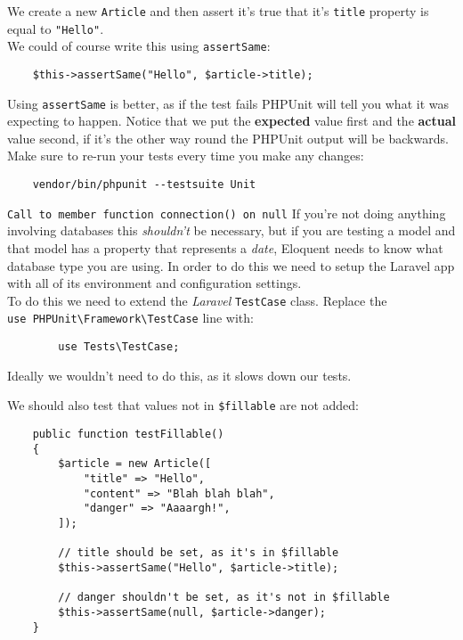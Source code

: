 We create a new \texttt{Article} and then assert it's true that it's \texttt{title} property is equal to \texttt{"Hello"}.
\\


We could of course write this using \texttt{assertSame}:

\begin{verbatim}
    $this->assertSame("Hello", $article->title);
\end{verbatim}

Using \texttt{assertSame} is better, as if the test fails PHPUnit will tell you what it was expecting to happen. Notice that we put the \textbf{expected} value first and the \textbf{actual} value second, if it's the other way round the PHPUnit output will be backwards.
\\

Make sure to re-run your tests every time you make any changes:

\begin{verbatim}
    vendor/bin/phpunit --testsuite Unit
\end{verbatim}


\pagebreak


\begin{infobox}{\texttt{Call to member function connection() on null}}
    If you're not doing anything involving databases this \textit{shouldn't} be necessary, but if you are testing a model and that model has a property that represents a \textit{date}, Eloquent needs to know what database type you are using. In order to do this we need to setup the Laravel app with all of its environment and configuration settings.
    \\

    To do this we need to extend the \textit{Laravel} \texttt{TestCase} class. Replace the \\ \texttt{use PHPUnit\textbackslash{}Framework\textbackslash{}TestCase} line with:

    \begin{verbatim}
        use Tests\TestCase;
    \end{verbatim}

    Ideally we wouldn't need to do this, as it slows down our tests.
\end{infobox}

We should also test that values not in \texttt{\$fillable} are not added:

\begin{verbatim}
    public function testFillable()
    {
        $article = new Article([
            "title" => "Hello",
            "content" => "Blah blah blah",
            "danger" => "Aaaargh!",
        ]);

        // title should be set, as it's in $fillable
        $this->assertSame("Hello", $article->title);

        // danger shouldn't be set, as it's not in $fillable
        $this->assertSame(null, $article->danger);
    }
\end{verbatim}

